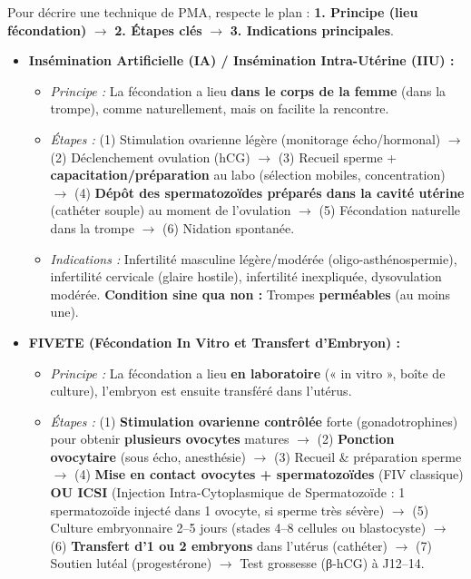 \documentclass[11pt]{article}
\begin{document}
\begin{methode}
Pour décrire une technique de PMA, respecte le plan : \textbf{1. Principe (lieu fécondation)} $\rightarrow$ \textbf{2. Étapes clés} $\rightarrow$ \textbf{3. Indications principales}.
\begin{itemize}
\item \textbf{Insémination Artificielle (IA) / Insémination Intra-Utérine (IIU) :}
\begin{itemize}
\item \emph{Principe :} La fécondation a lieu \textbf{dans le corps de la femme} (dans la trompe), comme naturellement, mais on facilite la rencontre.
\item \emph{Étapes :} (1) Stimulation ovarienne légère (monitorage écho/hormonal) $\rightarrow$ (2) Déclenchement ovulation (hCG) $\rightarrow$ (3) Recueil sperme + \textbf{capacitation/préparation} au labo (sélection mobiles, concentration) $\rightarrow$ (4) \textbf{Dépôt des spermatozoïdes préparés dans la cavité utérine} (cathéter souple) au moment de l'ovulation $\rightarrow$ (5) Fécondation naturelle dans la trompe $\rightarrow$ (6) Nidation spontanée.
\item \emph{Indications :} Infertilité masculine légère/modérée (oligo-asthénospermie), infertilité cervicale (glaire hostile), infertilité inexpliquée, dysovulation modérée. \textbf{Condition sine qua non :} Trompes \textbf{perméables} (au moins une).
\end{itemize}
\item \textbf{FIVETE (Fécondation In Vitro et Transfert d'Embryon) :}
\begin{itemize}
\item \emph{Principe :} La fécondation a lieu \textbf{en laboratoire} (« in vitro », boîte de culture), l'embryon est ensuite transféré dans l'utérus.
\item \emph{Étapes :} (1) \textbf{Stimulation ovarienne contrôlée} forte (gonadotrophines) pour obtenir \textbf{plusieurs ovocytes} matures $\rightarrow$ (2) \textbf{Ponction ovocytaire} (sous écho, anesthésie) $\rightarrow$ (3) Recueil \& préparation sperme $\rightarrow$ (4) \textbf{Mise en contact ovocytes + spermatozoïdes} (FIV classique) \textbf{OU ICSI} (Injection Intra-Cytoplasmique de Spermatozoïde : 1 spermatozoïde injecté dans 1 ovocyte, si sperme très sévère) $\rightarrow$ (5) Culture embryonnaire 2--5 jours (stades 4--8 cellules ou blastocyste) $\rightarrow$ (6) \textbf{Transfert d'1 ou 2 embryons} dans l'utérus (cathéter) $\rightarrow$ (7) Soutien lutéal (progestérone) $\rightarrow$ Test grossesse (β-hCG) à J12--14.

\end{itemize}
\end{itemize}
\end{methode}
\end{document}
